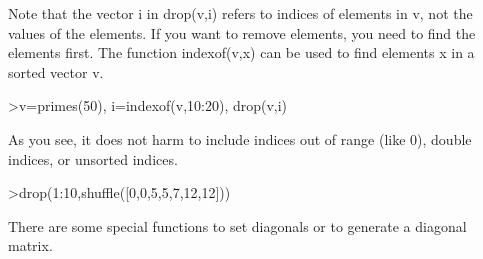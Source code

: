 \documentclass{article}
\begin{document}
\begin{eulernotebook}
\begin{eulercomment}
\begin{eulercomment}
\begin{eulercomment}
\begin{eulercomment}
\begin{eulercomment}
\begin{eulercomment}
\begin{euleroutput}
  [10,  11,  13,  14,  15,  16,  17,  18,  19,  20]
\end{euleroutput}
\begin{eulercomment}
Note that the vector i in drop(v,i) refers to indices of elements in
v, not the values of the elements. If you want to remove elements, you
need to find the elements first. The function indexof(v,x) can be used
to find elements x in a sorted vector v.
\end{eulercomment}
\begin{eulerprompt}
>v=primes(50), i=indexof(v,10:20), drop(v,i)
\end{eulerprompt}
\begin{euleroutput}
  [2,  3,  5,  7,  11,  13,  17,  19,  23,  29,  31,  37,  41,  43,  47]
  [0,  5,  0,  6,  0,  0,  0,  7,  0,  8,  0]
  [2,  3,  5,  7,  23,  29,  31,  37,  41,  43,  47]
\end{euleroutput}
\begin{eulercomment}
As you see, it does not harm to include indices out of range (like 0),
double indices, or unsorted indices.
\end{eulercomment}
\begin{eulerprompt}
>drop(1:10,shuffle([0,0,5,5,7,12,12]))
\end{eulerprompt}
\begin{euleroutput}
  [1,  2,  3,  4,  6,  8,  9,  10]
\end{euleroutput}
\begin{eulercomment}
There are some special functions to set diagonals or to generate a
diagonal matrix.


\end{eulercomment}
\end{eulercomment}
\end{eulercomment}
\end{eulercomment}
\end{eulercomment}
\end{eulercomment}
\end{eulercomment}
\end{eulernotebook}
\end{document}
